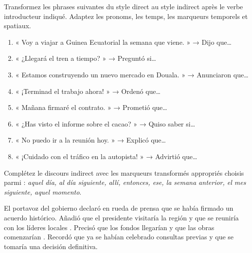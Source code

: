 \documentclass[11pt]{article}
\begin{document}
\begin{exercice}
Transformez les phrases suivantes du style direct au style indirect après le verbe introducteur indiqué. Adaptez les pronoms, les temps, les marqueurs temporels et spatiaux.
\begin{enumerate}
\item « Voy a viajar a Guinea Ecuatorial la semana que viene. » → Dijo que…
\item « ¿Llegará el tren a tiempo? » → Preguntó si…
\item « Estamos construyendo un nuevo mercado en Douala. » → Anunciaron que…
\item « ¡Terminad el trabajo ahora! » → Ordenó que…
\item « Mañana firmaré el contrato. » → Prometió que…
\item « ¿Has visto el informe sobre el cacao? » → Quiso saber si…
\item « No puedo ir a la reunión hoy. » → Explicó que…
\item « ¡Cuidado con el tráfico en la autopista! » → Advirtió que…
\end{enumerate}
\end{exercice}

\begin{exercice}
Complétez le discours indirect avec les marqueurs transformés appropriés choisis parmi : \emph{aquel día, al día siguiente, allí, entonces, ese, la semana anterior, el mes siguiente, aquel momento}.
\begin{textebox}
El portavoz del gobierno declaró en rueda de prensa que \underline{\hspace{2cm}} se había firmado un acuerdo histórico. Añadió que el presidente visitaría la región \underline{\hspace{2cm}} y que se reuniría con los líderes locales \underline{\hspace{2cm}}. Precisó que los fondos llegarían \underline{\hspace{2cm}} y que las obras comenzarían \underline{\hspace{2cm}}. Recordó que \underline{\hspace{2cm}} ya se habían celebrado consultas previas y que \underline{\hspace{2cm}} se tomaría una decisión definitiva.
\end{textebox}
\end{exercice}
\end{document}
